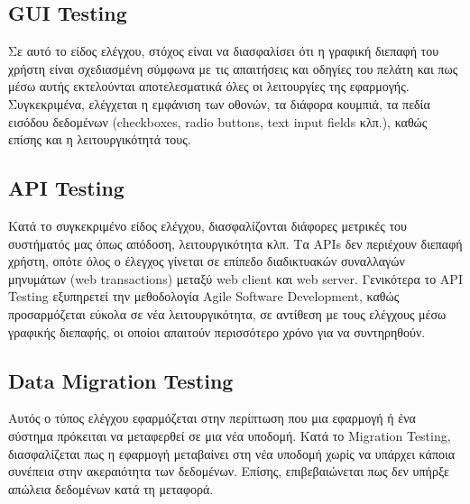 \subsection*{GUI Testing}
Σε αυτό το είδος ελέγχου, στόχος είναι να διασφαλίσει ότι η γραφική διεπαφή του χρήστη είναι σχεδιασμένη σύμφωνα με τις απαιτήσεις και οδηγίες 
του πελάτη και πως μέσω αυτής εκτελούνται αποτελεσματικά όλες οι λειτουργίες της εφαρμογής. Συγκεκριμένα, ελέγχεται η εμφάνιση των οθονών, τα 
διάφορα κουμπιά, τα πεδία εισόδου δεδομένων (checkboxes, radio buttons, text input fields κλπ.), καθώς επίσης και η λειτουργικότητά τους.

\subsection*{API Testing}
Κατά το συγκεκριμένο είδος ελέγχου, διασφαλίζονται διάφορες μετρικές του συστήματός μας όπως απόδοση, λειτουργικότητα κλπ. Τα APIs δεν 
περιέχουν διεπαφή χρήστη, οπότε όλος ο έλεγχος γίνεται σε επίπεδο διαδικτυακών συναλλαγών μηνυμάτων (web transactions) μεταξύ web client και 
web server. Γενικότερα το API Testing εξυπηρετεί την μεθοδολογία Agile Software Development, καθώς προσαρμόζεται εύκολα σε νέα λειτουργικότητα, 
σε αντίθεση με τους ελέγχους μέσω γραφικής διεπαφής, οι οποίοι απαιτούν περισσότερο χρόνο για να συντηρηθούν.

\subsection*{Data Migration Testing}
Αυτός ο τύπος ελέγχου εφαρμόζεται στην περίπτωση που μια εφαρμογή ή ένα σύστημα πρόκειται να μεταφερθεί σε μια νέα υποδομή. Κατά το Migration 
Testing, διασφαλίζεται πως η εφαρμογή μεταβαίνει στη νέα υποδομή χωρίς να υπάρχει κάποια συνέπεια στην ακεραιότητα των δεδομένων. Επίσης, 
επιβεβαιώνεται πως δεν υπήρξε απώλεια δεδομένων κατά τη μεταφορά.

